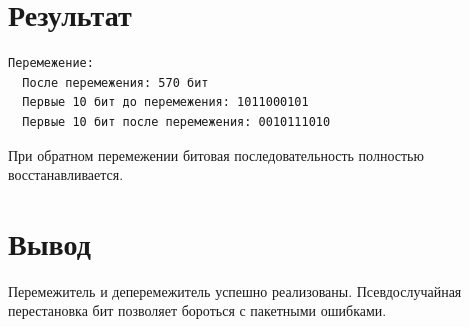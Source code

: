 \section{Результат}
\begin{verbatim}
Перемежение:
  После перемежения: 570 бит
  Первые 10 бит до перемежения: 1011000101
  Первые 10 бит после перемежения: 0010111010
\end{verbatim}
При обратном перемежении битовая последовательность полностью восстанавливается.

\section{Вывод}
Перемежитель и деперемежитель успешно реализованы. Псевдослучайная перестановка бит позволяет бороться с пакетными ошибками.